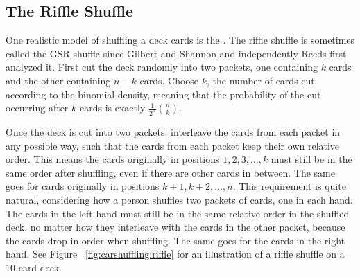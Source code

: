 \documentclass[12pt]{article}
\begin{document}
\subsection*{The Riffle Shuffle}

One realistic model of shuffling a deck cards is the .%
The riffle shuffle is sometimes called the GSR shuffle since Gilbert and
Shannon and independently Reeds first analyzed it.  First cut the deck
randomly into two packets, one containing \( k \) cards and the other
containing \( n-k \) cards.  Choose \( k \), the number of cards cut
according to the binomial density, meaning that the probability of the
cut occurring after \( k \) cards is exactly \( \frac{1}{2^n}\binom{n}{k}
\).

Once the deck is cut into two packets, interleave the cards from each
packet in any possible way, such that the cards from each packet keep
their own relative order.  This means the cards originally in positions \(
1, 2, 3, \dots, k \) must still be in the same order after shuffling,
even if there are other cards in between.  The same goes for cards
originally in positions \( k+1, k+2, \dots, n \).  This requirement is
quite natural, considering how a person shuffles two packets of
cards, one in each hand.  The cards in the left hand must still be in
the same relative order in the shuffled deck, no matter how they
interleave with the cards in the other packet, because the cards drop in
order when shuffling.  The same goes for the cards in the right hand.
See Figure~%
\ref{fig:carshuffling:riffle} for an illustration of a riffle shuffle on
a \( 10 \)-card deck.
\end{document}
